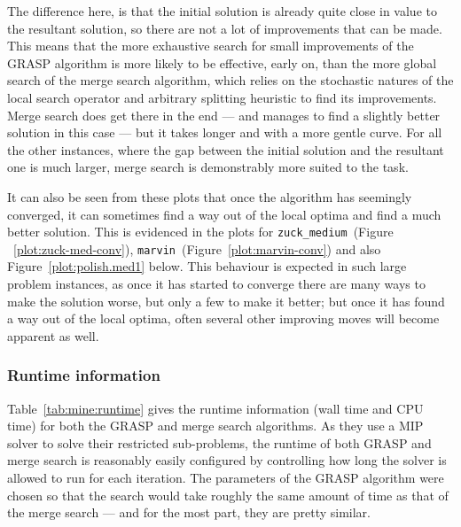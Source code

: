 \documentclass[authoryear,11pt,square,number,times,super,comma]{elsarticle}
\newcommand{\zuckmed}{\texttt{zuck\_medium}}
\newcommand{\marvin}{\texttt{marvin}}
\begin{document}
The difference here, is that the initial solution is already quite close in value to the resultant solution, so there are not a lot of improvements that can be made. This means that the more exhaustive search for small improvements of the GRASP algorithm is more likely to be effective, early on, than the more global search of the merge search algorithm, which relies on the stochastic natures of the local search operator and arbitrary splitting heuristic to find its improvements. Merge search does get there in the end --- and manages to find a slightly better solution in this case --- but it takes longer and with a more gentle curve. For all the other instances, where the gap between the initial solution and the resultant one is much larger, merge search is demonstrably more suited to the task.

It can also be seen from these plots that once the algorithm has seemingly converged, it can sometimes find a way out of the local optima and find a much better solution. This is evidenced in the plots for \zuckmed{}~(Figure ~\ref{plot:zuck-med-conv}), \marvin{}~(Figure~\ref{plot:marvin-conv}) and also Figure~\ref{plot:polish.med1} below. This behaviour is expected in such large problem instances, as once it has started to converge there are many ways to make the solution worse, but only a few to make it better; but once it has found a way out of the local optima, often several other improving moves will become apparent as well.

\subsubsection*{Runtime information}

Table~\ref{tab:mine:runtime} gives the runtime information (wall time and CPU time) for both the GRASP and merge search algorithms. As they use a MIP solver to solve their restricted sub-problems, the runtime of both GRASP and merge search is reasonably easily configured by controlling how long the solver is allowed to run for each iteration. The parameters of the GRASP algorithm were chosen so that the search would take roughly the same amount of time as that of the merge search --- and for the most part, they are pretty similar. 
\end{document}

